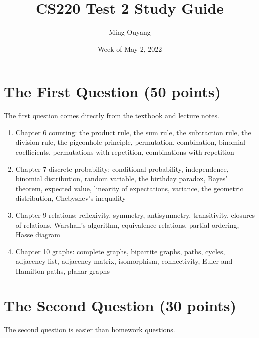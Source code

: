 \documentclass[11pt]{article}
\title{CS220 Test 2 Study Guide}
\author{Ming Ouyang}
\date{Week of May 2, 2022}
\begin{document}
\maketitle

\section{The First Question (50 points)}
The first question comes directly from the textbook and lecture notes.

\begin{enumerate}
    \item Chapter 6 counting: the product rule, the sum rule, the subtraction rule, the division rule, the pigeonhole principle, permutation, combination, binomial coefficients, permutations with repetition, combinations with repetition
    \item Chapter 7 discrete probability:  conditional probability, independence, binomial distribution, random variable, the birthday paradox, Bayes’ theorem, expected value, linearity of expectations, variance, the geometric distribution, Chebyshev’s inequality
    \item Chapter 9 relations: reflexivity, symmetry, antisymmetry, transitivity, closures of relations, Warshall’s algorithm, equivalence relations, partial ordering, Hasse diagram
    \item Chapter 10 graphs: complete graphs, bipartite graphs, paths, cycles, adjacency list, adjacency matrix, isomorphism, connectivity, Euler and Hamilton paths, planar graphs
\end{enumerate}

\section{The Second Question (30 points)}
The second question is easier than homework questions.
\end{document}
